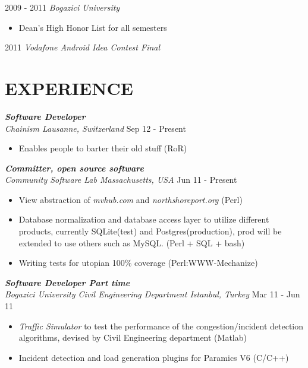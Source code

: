 \documentclass[line, margin]{res}
\begin{document}
\begin{resume}
				2009 - 2011 {\sl Bogazici University }
				\begin{itemize} \itemsep -2pt
					\item Dean's High Honor List for all semesters	
				\end{itemize}

				2011 {\sl Vodafone Android Idea Contest Final} \\
 
\section{EXPERIENCE}
				{\sl \textbf{Software Developer} \\
				Chainism Lausanne, Switzerland } \hfill Sep 12 - Present 
				\vspace{-0.3cm} \\
				\begin{itemize} \itemsep -2pt
					\item Enables people to barter their old stuff (RoR)
				\end{itemize}
 
				{\sl \textbf{Committer, open source software} \\ Community Software Lab Massachusetts, USA} \hfill Jun 11 - Present \\
				\vspace{-0.3cm}
				\begin{itemize} \itemsep -2pt
					\item View abstraction of \textit{mvhub.com} and \textit{northshoreport.org} (Perl)
					\item Database normalization and database access layer to utilize different products, currently SQLite(test) and Postgres(production), prod will be extended to use others such as MySQL. (Perl + SQL + bash)
					\item Writing tests for utopian 100\% coverage (Perl:WWW-Mechanize)
				\end{itemize}

				{\sl \textbf{Software Developer Part time} \\ Bogazici University Civil Engineering Department Istanbul, Turkey} \hfill Mar 11 - Jun 11 \\
				\vspace{-0.3cm}
				\begin{itemize} \itemsep -2pt
					\item \textit{Traffic Simulator} to test the performance of the congestion/incident detection algorithms, devised by Civil Engineering department (Matlab)
					\item Incident detection and load generation plugins for Paramics V6 (C/C++)
				\end{itemize}


\end{resume}
\end{document}
